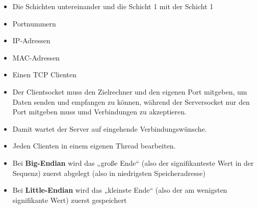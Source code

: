 
\begin{itemize}
    \item Die Schichten untereinander und die Schicht 1 mit der Schicht 1
\end{itemize}

\begin{itemize}
    \item Portnummern
    \item IP-Adressen
    \item MAC-Adressen
\end{itemize}

\begin{itemize}
    \item Einen TCP Clienten
\end{itemize}

\begin{itemize}
    \item Der Clientsocket muss den Zielrechner und den eigenen Port mitgeben, um Daten senden und empfangen zu können, während der Serversocket nur den Port mitgeben muss umd Verbindungen zu akzeptieren.
\end{itemize}

\begin{itemize}
    \item Damit wartet der Server auf eingehende Verbindungswünsche.
\end{itemize}

\begin{itemize}
    \item Jeden Clienten in einem eigenen Thread bearbeiten.
\end{itemize}

\begin{itemize}
    \item Bei \textbf{Big-Endian} wird das „große Ende“ (also der signifikanteste Wert in der Sequenz) zuerst abgelegt (also in niedrigsten Speicheradresse)
    \item Bei \textbf{Little-Endian} wird das „kleinste Ende“ (also der am wenigsten signifikante Wert) zuerst gespeichert
\end{itemize}

